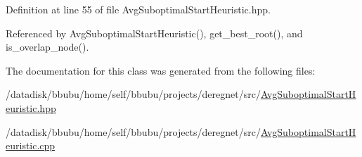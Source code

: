 Definition at line 55 of file Avg\+Suboptimal\+Start\+Heuristic.\+hpp.



Referenced by Avg\+Suboptimal\+Start\+Heuristic(), get\+\_\+best\+\_\+root(), and is\+\_\+overlap\+\_\+node().



The documentation for this class was generated from the following files\+:\begin{DoxyCompactItemize}
\item 
/datadisk/bbubu/home/self/bbubu/projects/deregnet/src/\hyperlink{AvgSuboptimalStartHeuristic_8hpp}{Avg\+Suboptimal\+Start\+Heuristic.\+hpp}\item 
/datadisk/bbubu/home/self/bbubu/projects/deregnet/src/\hyperlink{AvgSuboptimalStartHeuristic_8cpp}{Avg\+Suboptimal\+Start\+Heuristic.\+cpp}\end{DoxyCompactItemize}
